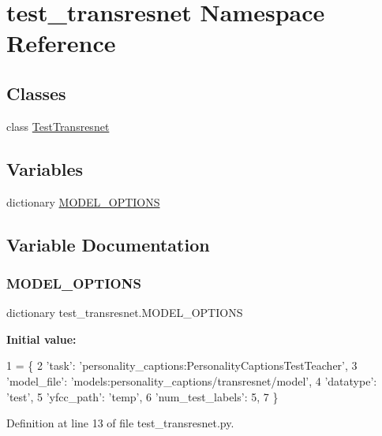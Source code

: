 \hypertarget{namespacetest__transresnet}{}\section{test\+\_\+transresnet Namespace Reference}
\label{namespacetest__transresnet}
\subsection*{Classes}
\begin{DoxyCompactItemize}
\item 
class \hyperlink{classtest__transresnet_1_1TestTransresnet}{Test\+Transresnet}
\end{DoxyCompactItemize}
\subsection*{Variables}
\begin{DoxyCompactItemize}
\item 
dictionary \hyperlink{namespacetest__transresnet_a443ec3fdb6b3da0fe5aa2f03a0b24f86}{M\+O\+D\+E\+L\+\_\+\+O\+P\+T\+I\+O\+NS}
\end{DoxyCompactItemize}


\subsection{Variable Documentation}
\mbox{\label{namespacetest__transresnet_a443ec3fdb6b3da0fe5aa2f03a0b24f86}} 
\subsubsection{\texorpdfstring{M\+O\+D\+E\+L\+\_\+\+O\+P\+T\+I\+O\+NS}{MODEL\_OPTIONS}}
{\footnotesize\ttfamily dictionary test\+\_\+transresnet.\+M\+O\+D\+E\+L\+\_\+\+O\+P\+T\+I\+O\+NS}

{\bfseries Initial value\+:}
\begin{DoxyCode}
1 =  \{
2     \textcolor{stringliteral}{'task'}: \textcolor{stringliteral}{'personality\_captions:PersonalityCaptionsTestTeacher'},
3     \textcolor{stringliteral}{'model\_file'}: \textcolor{stringliteral}{'models:personality\_captions/transresnet/model'},
4     \textcolor{stringliteral}{'datatype'}: \textcolor{stringliteral}{'test'},
5     \textcolor{stringliteral}{'yfcc\_path'}: \textcolor{stringliteral}{'temp'},
6     \textcolor{stringliteral}{'num\_test\_labels'}: 5,
7 \}
\end{DoxyCode}


Definition at line 13 of file test\+\_\+transresnet.\+py.

